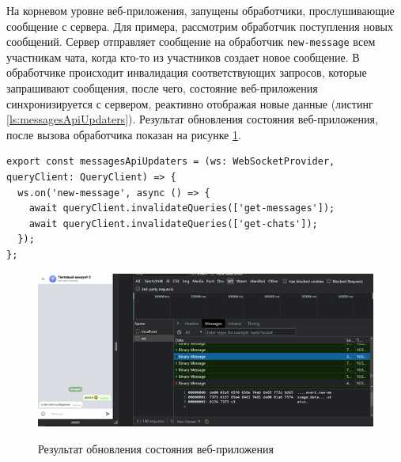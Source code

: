 На корневом уровне веб-приложения, запущены обработчики, прослушивающие сообщение с сервера. Для примера, рассмотрим обработчик поступления новых сообщений. Сервер отправляет сообщение на обработчик \verb|new-message| всем участникам чата, когда кто-то из участников создает новое сообщение.  В обработчике происходит инвалидация соответствующих запросов, которые запрашивают сообщения, после чего, состояние веб-приложения синхронизируется с сервером, реактивно отображая новые данные (листинг \ref{ls:messagesApiUpdaters}). Результат обновления состояния веб-приложения, после вызова обработчика показан на рисунке \ref{fig:web-app-ws-handler}.

\begin{lstlisting}[caption={Глобальный обработчик подписанный на WebSocket событие}, label={ls:messagesApiUpdaters}]
export const messagesApiUpdaters = (ws: WebSocketProvider, queryClient: QueryClient) => {
  ws.on('new-message', async () => {
    await queryClient.invalidateQueries(['get-messages']);
    await queryClient.invalidateQueries(['get-chats']);
  });
}; 
\end{lstlisting}

\begin{figure}[H]
\begin{center}
\includegraphics[width=1.0\hsize]{fig/web-app-ws-handler.png}\\[2mm]
\caption{Результат обновления состояния веб-приложения}\label{fig:web-app-ws-handler}
\end{center}
\end{figure}